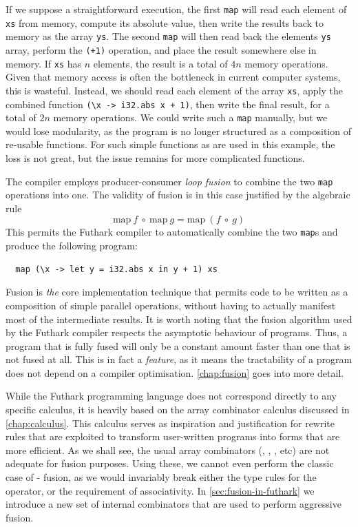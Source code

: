 If we suppose a straightforward execution, the first \lstinline{map}
will read each element of \lstinline{xs} from memory, compute its
absolute value, then write the results back to memory as the array
\lstinline{ys}.  The second \lstinline{map} will then read back the
elements \lstinline{ys} array, perform the \lstinline{(+1)} operation,
and place the result somewhere else in memory.  If \lstinline{xs} has
$n$ elements, the result is a total of $4n$ memory operations.  Given
that memory access is often the bottleneck in current computer
systems, this is wasteful.  Instead, we should read each element of
the array \lstinline{xs}, apply the combined function \lstinline{(\x -> i32.abs x + 1)}, then write the final result, for a total of $2n$
memory operations.  We could write such a \lstinline{map} manually,
but we would lose modularity, as the program is no longer structured
as a composition of re-usable functions.  For such simple functions as
are used in this example, the loss is not great, but the issue remains
for more complicated functions.

The compiler employs producer-consumer \textit{loop fusion} to combine
the two \lstinline{map} operations into one.  The validity of fusion
is in this case justified by the algebraic rule
\[
  \text{map}~f~\circ~\text{map}~g=\text{map}~(f~\circ~g)
\]
This permits the Futhark compiler to automatically combine the two
\lstinline{map}s and produce the following program:

\begin{lstlisting}
  map (\x -> let y = i32.abs x in y + 1) xs
\end{lstlisting}

Fusion is \textit{the} core implementation technique that permits code
to be written as a composition of simple parallel operations, without
having to actually manifest most of the intermediate results.  It is
worth noting that the fusion algorithm used by the Futhark compiler
respects the asymptotic behaviour of programs.  Thus, a program that
is fully fused will only be a constant amount faster than one that is
not fused at all.  This is in fact a \textit{feature}, as it means the
tractability of a program does not depend on a compiler optimisation.
\cref{chap:fusion} goes into more detail.

While the Futhark programming language does not correspond directly to
any specific calculus, it is heavily based on the array combinator
calculus discussed in \cref{chap:calculus}.  This calculus serves as
inspiration and justification for rewrite rules that are exploited to
transform user-written programs into forms that are more efficient.
As we shall see, the usual array combinators (, ,
, etc) are not adequate for fusion purposes.  Using these, we
cannot even perform the classic case of - fusion,
as we would invariably break either the type rules for the 
operator, or the requirement of associativity.  In
\cref{sec:fusion-in-futhark} we introduce a new set of internal
combinators that are used to perform aggressive fusion.

